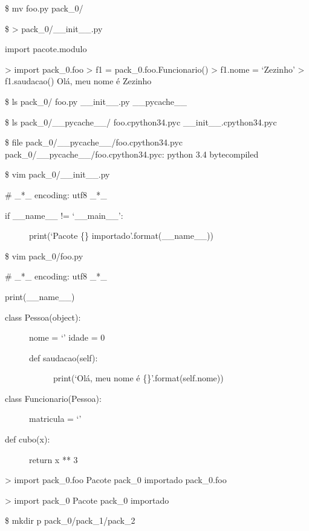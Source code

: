 \documentclass[letterpaper,10pt,brazil]{sphinxmanual}
\begin{document}
\$ mv foo.py pack\_0/

\$ \textgreater{} pack\_0/\_\_init\_\_.py

import pacote.modulo

\textgreater{} import pack\_0.foo
\textgreater{} f1 = pack\_0.foo.Funcionario()
\textgreater{} f1.nome = ‘Zezinho’
\textgreater{} f1.saudacao()
Olá, meu nome é Zezinho

\$ ls pack\_0/
foo.py  \_\_init\_\_.py  \_\_pycache\_\_

\$ ls pack\_0/\_\_pycache\_\_/
foo.cpython\sphinxhyphen{}34.pyc  \_\_init\_\_.cpython\sphinxhyphen{}34.pyc

\$ file pack\_0/\_\_pycache\_\_/foo.cpython\sphinxhyphen{}34.pyc
pack\_0/\_\_pycache\_\_/foo.cpython\sphinxhyphen{}34.pyc: python 3.4 byte\sphinxhyphen{}compiled

\$ vim pack\_0/\_\_init\_\_.py

\# \_*\_ encoding: utf\sphinxhyphen{}8 \_*\_
\begin{description}
\item[{if \_\_name\_\_ != ‘\_\_main\_\_’:}] \leavevmode
print(‘Pacote \{\} importado’.format(\_\_name\_\_))

\end{description}

\$ vim pack\_0/foo.py

\# \_*\_ encoding: utf\sphinxhyphen{}8 \_*\_

print(\_\_name\_\_)
\begin{description}
\item[{class Pessoa(object):}] \leavevmode
nome = ‘’
idade = 0
\begin{description}
\item[{def saudacao(self):}] \leavevmode
print(‘Olá, meu nome é \{\}’.format(self.nome))

\end{description}

\item[{class Funcionario(Pessoa):}] \leavevmode
matricula = ‘’

\item[{def cubo(x):}] \leavevmode
return x ** 3

\end{description}

\textgreater{} import pack\_0.foo
Pacote pack\_0 importado
pack\_0.foo

\textgreater{} import pack\_0
Pacote pack\_0 importado

\$ mkdir \sphinxhyphen{}p pack\_0/pack\_1/pack\_2
\end{document}
